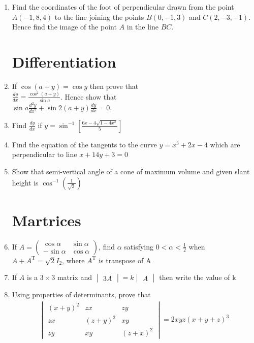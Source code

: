 \documentclass[12pt,-letter paper]{article}
\newcommand{\myvec}[1]{\ensuremath{\begin{pmatrix}#1\end{pmatrix}}}
\newcommand{\mydet}[1]{\ensuremath{\begin{vmatrix}#1\end{vmatrix}}}
\providecommand{\sbrak}[1]{\ensuremath{{}\left[#1\right]}}
\begin{document}
\begin{enumerate}
	\item Find the coordinates of the foot of perpendicular drawn from the point
$A(-1, 8, 4)$ to the line joining the points $B(0, -1, 3)$ and $C(2,-3,-1)$. Hence
find the image of the point $A$ in the line $BC$.





\section{Differentiation}
	\item If $\cos(a+y) = \cos y$ then prove that \\
$\frac{dy}{dx} = \frac{\cos^{2}(a+y)}{\sin a}$. 
Hence show that \\
$\sin a \frac{d^{2}y}{dx^{2}} + \sin 2(a+y)\frac{dy}{dx} = 0 $.

	\item Find $\frac{dy}{dx}$ if $y = \sin^{-1}\sbrak{\frac{6x - 4\sqrt{1-4x^2}}{5}}$ 

	\item Find the equation of the tangents to the curve $y = x^3 + 2x - 4$ which are perpendicular to line $x + 14y + 3 = 0$
	
	\item Show that semi-vertical angle of a cone of maximum volume and given slant height is
$\cos^{-1}\left( \frac{1}{\sqrt{3}} \right)$




\section{Martrices}
	\item If $A = \myvec{\cos \alpha & \sin \alpha\\ -\sin \alpha & \cos \alpha}$, find $\alpha$ satisfying $0<\alpha<\frac{1}{2}$ when $A + A^{\text{T}} = \sqrt{2}I_{2}$, where $A^{\text{T}}$ is transpose of A

	\item If $A$ is a $3\times3$ matrix and $\mydet{3A} = k \mydet{A}$ then write the value of k

	\item Using properties of determinants, prove that
	\begin{align}
		\mydet{(x + y)^2 & zx & zy \\
		zx & (z+y)^2 & xy \\
		zy & xy & (z+x)^2}
		 = 2xyz (x + y + z)^3
	\end{align}
	

\end{enumerate}
\end{document}

